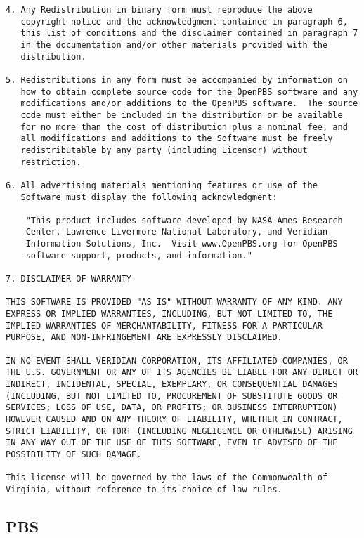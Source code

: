 \begin{verbatim}
4. Any Redistribution in binary form must reproduce the above
   copyright notice and the acknowledgment contained in paragraph 6,
   this list of conditions and the disclaimer contained in paragraph 7
   in the documentation and/or other materials provided with the
   distribution.

5. Redistributions in any form must be accompanied by information on
   how to obtain complete source code for the OpenPBS software and any
   modifications and/or additions to the OpenPBS software.  The source
   code must either be included in the distribution or be available
   for no more than the cost of distribution plus a nominal fee, and
   all modifications and additions to the Software must be freely
   redistributable by any party (including Licensor) without
   restriction.

6. All advertising materials mentioning features or use of the
   Software must display the following acknowledgment:

    "This product includes software developed by NASA Ames Research
    Center, Lawrence Livermore National Laboratory, and Veridian
    Information Solutions, Inc.  Visit www.OpenPBS.org for OpenPBS
    software support, products, and information."

7. DISCLAIMER OF WARRANTY

THIS SOFTWARE IS PROVIDED "AS IS" WITHOUT WARRANTY OF ANY KIND. ANY
EXPRESS OR IMPLIED WARRANTIES, INCLUDING, BUT NOT LIMITED TO, THE
IMPLIED WARRANTIES OF MERCHANTABILITY, FITNESS FOR A PARTICULAR
PURPOSE, AND NON-INFRINGEMENT ARE EXPRESSLY DISCLAIMED.

IN NO EVENT SHALL VERIDIAN CORPORATION, ITS AFFILIATED COMPANIES, OR
THE U.S. GOVERNMENT OR ANY OF ITS AGENCIES BE LIABLE FOR ANY DIRECT OR
INDIRECT, INCIDENTAL, SPECIAL, EXEMPLARY, OR CONSEQUENTIAL DAMAGES
(INCLUDING, BUT NOT LIMITED TO, PROCUREMENT OF SUBSTITUTE GOODS OR
SERVICES; LOSS OF USE, DATA, OR PROFITS; OR BUSINESS INTERRUPTION)
HOWEVER CAUSED AND ON ANY THEORY OF LIABILITY, WHETHER IN CONTRACT,
STRICT LIABILITY, OR TORT (INCLUDING NEGLIGENCE OR OTHERWISE) ARISING
IN ANY WAY OUT OF THE USE OF THIS SOFTWARE, EVEN IF ADVISED OF THE
POSSIBILITY OF SUCH DAMAGE.

This license will be governed by the laws of the Commonwealth of
Virginia, without reference to its choice of law rules.
\end{verbatim}
%
%
%

\subsection{PBS}

